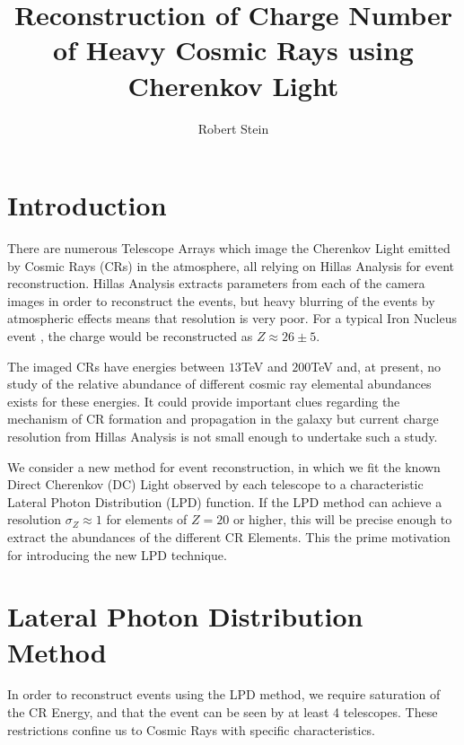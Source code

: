 \documentclass{article}
\begin{document}
\title{Reconstruction of Charge Number of Heavy Cosmic Rays using Cherenkov Light}
\author{Robert Stein}
\maketitle
\section{Introduction}
There are numerous Telescope Arrays which image the Cherenkov Light emitted by Cosmic Rays (CRs) in the atmosphere, all relying on Hillas Analysis for event reconstruction. Hillas Analysis extracts parameters from each of the camera images in order to reconstruct the events, but heavy blurring of the events by atmospheric effects means that resolution is very poor. For a typical Iron Nucleus event \cite{hess07}, the charge would be reconstructed as $Z \approx 26 \pm 5 $.

The imaged CRs have energies between $13 $TeV and $200 $TeV and, at present, no study of the relative abundance of different cosmic ray elemental abundances exists for these energies. It could provide important clues regarding the mechanism of CR formation and propagation in the galaxy but current charge resolution from Hillas Analysis is not small enough to undertake such a study.

We consider a new method for event reconstruction, in which we fit the known Direct Cherenkov (DC) Light observed by each telescope to a characteristic Lateral Photon Distribution (LPD) function. If the LPD method can achieve a resolution $ \sigma_{Z} \approx 1 $ for elements of $Z = 20$ or higher, this will be precise enough to extract the abundances of the different CR Elements. This the prime motivation for introducing the new LPD technique.

\section{Lateral Photon Distribution Method}
In order to reconstruct events using the LPD method, we require saturation of the CR Energy, and that the event can be seen by at least 4 telescopes. These restrictions confine us to Cosmic Rays with specific characteristics.
\end{document}
